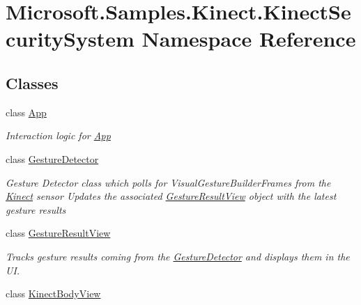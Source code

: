 \hypertarget{namespace_microsoft_1_1_samples_1_1_kinect_1_1_kinect_security_system}{}\section{Microsoft.\+Samples.\+Kinect.\+Kinect\+Security\+System Namespace Reference}
\label{namespace_microsoft_1_1_samples_1_1_kinect_1_1_kinect_security_system}
\subsection*{Classes}
\begin{DoxyCompactItemize}
\item 
class \hyperlink{class_microsoft_1_1_samples_1_1_kinect_1_1_kinect_security_system_1_1_app}{App}
\begin{DoxyCompactList}\small\item\em Interaction logic for \hyperlink{class_microsoft_1_1_samples_1_1_kinect_1_1_kinect_security_system_1_1_app}{App} \end{DoxyCompactList}\item 
class \hyperlink{class_microsoft_1_1_samples_1_1_kinect_1_1_kinect_security_system_1_1_gesture_detector}{Gesture\+Detector}
\begin{DoxyCompactList}\small\item\em Gesture Detector class which polls for Visual\+Gesture\+Builder\+Frames from the \hyperlink{namespace_microsoft_1_1_samples_1_1_kinect}{Kinect} sensor Updates the associated \hyperlink{class_microsoft_1_1_samples_1_1_kinect_1_1_kinect_security_system_1_1_gesture_result_view}{Gesture\+Result\+View} object with the latest gesture results \end{DoxyCompactList}\item 
class \hyperlink{class_microsoft_1_1_samples_1_1_kinect_1_1_kinect_security_system_1_1_gesture_result_view}{Gesture\+Result\+View}
\begin{DoxyCompactList}\small\item\em Tracks gesture results coming from the \hyperlink{class_microsoft_1_1_samples_1_1_kinect_1_1_kinect_security_system_1_1_gesture_detector}{Gesture\+Detector} and displays them in the UI. \end{DoxyCompactList}\item 
class \hyperlink{class_microsoft_1_1_samples_1_1_kinect_1_1_kinect_security_system_1_1_kinect_body_view}{Kinect\+Body\+View}

\end{DoxyCompactItemize}
